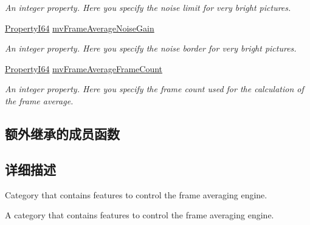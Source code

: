 \begin{DoxyCompactItemize}
\begin{DoxyCompactList}\small\item\em An integer property. Here you specify the noise limit for very bright pictures. \end{DoxyCompactList}\item 
\hyperlink{group___common_interface_ga81749b2696755513663492664a18a893}{Property\+I64} \hyperlink{classmv_i_m_p_a_c_t_1_1acquire_1_1_gen_i_cam_1_1mv_frame_average_control_ab07c97e67b40044a87b4fc9b511d6c8b}{mv\+Frame\+Average\+Noise\+Gain}
\begin{DoxyCompactList}\small\item\em An integer property. Here you specify the noise border for very bright pictures. \end{DoxyCompactList}\item 
\hyperlink{group___common_interface_ga81749b2696755513663492664a18a893}{Property\+I64} \hyperlink{classmv_i_m_p_a_c_t_1_1acquire_1_1_gen_i_cam_1_1mv_frame_average_control_a1dbf6189418f2413d66c53de4f99a91b}{mv\+Frame\+Average\+Frame\+Count}
\begin{DoxyCompactList}\small\item\em An integer property. Here you specify the frame count used for the calculation of the frame average. \end{DoxyCompactList}\end{DoxyCompactItemize}
\subsection*{额外继承的成员函数}


\subsection{详细描述}
Category that contains features to control the frame averaging engine. 

A category that contains features to control the frame averaging engine. 

